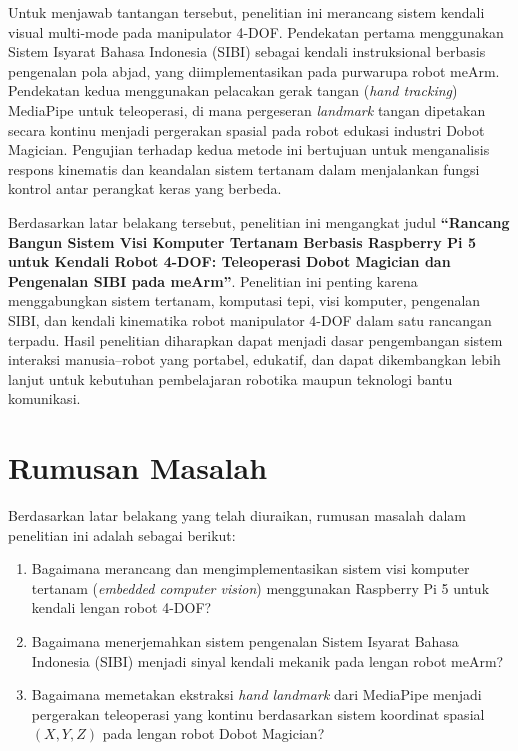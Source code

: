Untuk menjawab tantangan tersebut, penelitian ini merancang sistem kendali visual multi-mode pada manipulator 4-DOF. Pendekatan pertama menggunakan Sistem Isyarat Bahasa Indonesia (SIBI) sebagai kendali instruksional berbasis pengenalan pola abjad, yang diimplementasikan pada purwarupa robot meArm. Pendekatan kedua menggunakan pelacakan gerak tangan (\textit{hand tracking}) MediaPipe untuk teleoperasi, di mana pergeseran \textit{landmark} tangan dipetakan secara kontinu menjadi pergerakan spasial pada robot edukasi industri Dobot Magician. Pengujian terhadap kedua metode ini bertujuan untuk menganalisis respons kinematis dan keandalan sistem tertanam dalam menjalankan fungsi kontrol antar perangkat keras yang berbeda.

Berdasarkan latar belakang tersebut, penelitian ini mengangkat judul \textbf{``Rancang Bangun Sistem Visi Komputer Tertanam Berbasis Raspberry Pi 5 untuk Kendali Robot 4-DOF: Teleoperasi Dobot Magician dan Pengenalan SIBI pada meArm''}. Penelitian ini penting karena menggabungkan sistem tertanam, komputasi tepi, visi komputer, pengenalan SIBI, dan kendali kinematika robot manipulator 4-DOF dalam satu rancangan terpadu. Hasil penelitian diharapkan dapat menjadi dasar pengembangan sistem interaksi manusia--robot yang portabel, edukatif, dan dapat dikembangkan lebih lanjut untuk kebutuhan pembelajaran robotika maupun teknologi bantu komunikasi.

\section{Rumusan Masalah}
Berdasarkan latar belakang yang telah diuraikan, rumusan masalah dalam penelitian ini adalah sebagai berikut:
\begin{enumerate}[label=\arabic*.]
    \item Bagaimana merancang dan mengimplementasikan sistem visi komputer tertanam (\textit{embedded computer vision}) menggunakan Raspberry Pi 5 untuk kendali lengan robot 4-DOF?
    \item Bagaimana menerjemahkan sistem pengenalan Sistem Isyarat Bahasa Indonesia (SIBI) menjadi sinyal kendali mekanik pada lengan robot meArm?
    \item Bagaimana memetakan ekstraksi \textit{hand landmark} dari MediaPipe menjadi pergerakan teleoperasi yang kontinu berdasarkan sistem koordinat spasial $(X,Y,Z)$ pada lengan robot Dobot Magician?
\end{enumerate}

